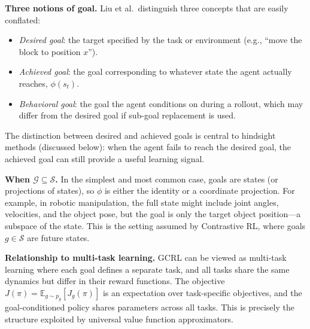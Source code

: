 \documentclass[11pt, letterpaper]{article}
\begin{document}
\begin{remark}
    \textbf{Three notions of goal.} Liu et al.\ distinguish three concepts that are easily conflated:
    \begin{itemize}
        \item \textit{Desired goal}: the target specified by the task or environment (e.g., ``move the block to position \(x\)'').
        \item \textit{Achieved goal}: the goal corresponding to whatever state the agent actually reaches, \(\phi(s_t)\).
        \item \textit{Behavioral goal}: the goal the agent conditions on during a rollout, which may differ from the desired goal if sub-goal replacement is used.
    \end{itemize}
    The distinction between desired and achieved goals is central to hindsight methods (discussed below): when the agent fails to reach the desired goal, the achieved goal can still provide a useful learning signal.
 
    \textbf{When \(\mathcal{G} \subseteq \mathcal{S}\).} In the simplest and most common case, goals are states (or projections of states), so \(\phi\) is either the identity or a coordinate projection. For example, in robotic manipulation, the full state might include joint angles, velocities, and the object pose, but the goal is only the target object position---a subspace of the state. This is the setting assumed by Contrastive RL, where goals \(g \in \mathcal{S}\) are future states.
 
    \textbf{Relationship to multi-task learning.} GCRL can be viewed as multi-task learning where each goal defines a separate task, and all tasks share the same dynamics but differ in their reward functions. The objective \(J(\pi) = \mathbb{E}_{g \sim p_g}[J_g(\pi)]\) is an expectation over task-specific objectives, and the goal-conditioned policy shares parameters across all tasks. This is precisely the structure exploited by universal value function approximators.
\end{remark}
 
\end{document}
